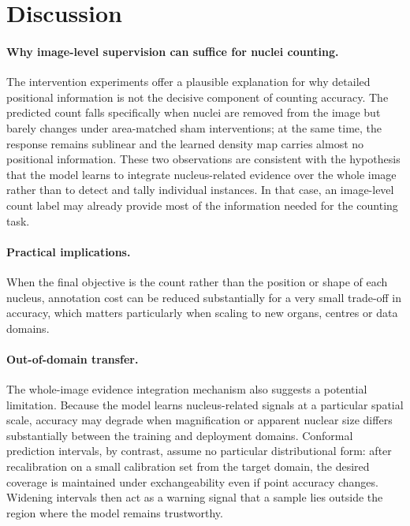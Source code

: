 \documentclass[pdflatex,sn-mathphys-num]{sn-jnl}
\begin{document}
\section{Discussion}\label{sec:discuss}

\paragraph{Why image-level supervision can suffice for nuclei counting.} The intervention experiments offer a
plausible explanation for why detailed positional information is not the decisive component of counting
accuracy. The predicted count falls specifically when nuclei are removed from the image but barely changes
under area-matched sham interventions; at the same time, the response remains sublinear and the learned density
map carries almost no positional information. These two observations are consistent with the hypothesis that
the model learns to integrate nucleus-related evidence over the whole image rather than to detect and tally
individual instances. In that case, an image-level count label may already provide most of the information
needed for the counting task.

\paragraph{Practical implications.} When the final objective is the count rather than the position or shape of
each nucleus, annotation cost can be reduced substantially for a very small trade-off in accuracy, which
matters particularly when scaling to new organs, centres or data domains.

\paragraph{Out-of-domain transfer.} The whole-image evidence integration mechanism also suggests a potential
limitation. Because the model learns nucleus-related signals at a particular spatial scale, accuracy may
degrade when magnification or apparent nuclear size differs substantially between the training and deployment
domains. Conformal prediction intervals, by contrast, assume no particular distributional form: after
recalibration on a small calibration set from the target domain, the desired coverage is maintained under
exchangeability even if point accuracy changes. Widening intervals then act as a warning signal that a sample
lies outside the region where the model remains trustworthy.
\end{document}
